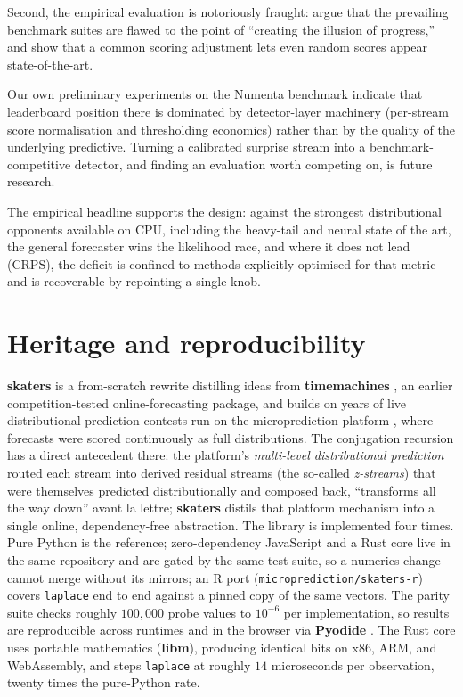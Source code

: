 \documentclass[article]{jss}
\providecommand{\proglang}[1]{\textsf{#1}}
\providecommand{\pkg}[1]{\textbf{#1}}
\providecommand{\code}[1]{\texttt{#1}}
\begin{document}
Second, the empirical evaluation is notoriously
fraught: \citet{wu2023current} argue that the prevailing benchmark suites
are flawed to the point of ``creating the illusion of progress,'' and
\citet{kim2022rigorous} show that a common scoring adjustment lets even random
scores appear state-of-the-art.

Our own preliminary experiments on the Numenta
benchmark \citep{lavin2015nab} indicate that leaderboard position there is
dominated by detector-layer machinery (per-stream score normalisation and
thresholding economics) rather than by the quality of the underlying
predictive. Turning a calibrated surprise stream into a benchmark-competitive
detector, and finding an evaluation worth competing on, is future research.

The
empirical headline supports the design: against the strongest distributional
opponents available on CPU, including the heavy-tail and neural state of the art,
the general forecaster wins the likelihood race, and where it does not lead
(CRPS), the deficit is confined to methods explicitly optimised for that metric
and is recoverable by repointing a single knob.

\section{Heritage and reproducibility} \label{sec:heritage}

\pkg{skaters} is a from-scratch rewrite distilling ideas from \pkg{timemachines}
\citep{cotton2021timemachines}, an earlier competition-tested online-forecasting
package, and builds on years of live distributional-prediction contests run on
the microprediction platform \citep{cotton2022microprediction}, where forecasts
were scored continuously as full distributions. The conjugation recursion has a
direct antecedent there: the platform's \emph{multi-level distributional
prediction} routed each stream
into derived residual streams (the so-called \emph{z-streams}) that were
themselves predicted distributionally and composed back, ``transforms all the way
down'' avant la lettre; \pkg{skaters} distils that platform mechanism into a
single online, dependency-free abstraction. The library is implemented four
times. Pure \proglang{Python} is the reference; zero-dependency
\proglang{JavaScript} and a \proglang{Rust} core live in the same
repository and are gated by the same test suite, so a numerics change
cannot merge without its mirrors; an \proglang{R} port
(\code{microprediction/skaters-r}) covers \code{laplace} end to end
against a pinned copy of the same vectors. The parity suite checks
roughly $100{,}000$ probe values to $10^{-6}$ per implementation, so
results are reproducible across runtimes and in the browser via
\pkg{Pyodide} \citep{pyodide2021}. The Rust core uses portable
mathematics (\pkg{libm}), producing identical bits on x86, ARM, and
WebAssembly, and steps \code{laplace} at roughly $14$ microseconds per
observation, twenty times the pure-\proglang{Python} rate.
\end{document}
